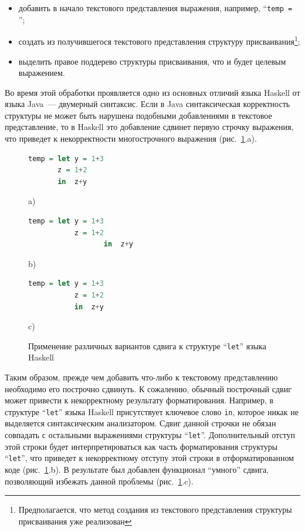 \begin{itemize}
\item добавить в начало текстового представления выражения, например, ``\lstinline{temp = }'';
\item создать из получившегося текстового представления структуру присваивания\footnote{Предполагается, что метод создания из текстового представления структуры присваивания уже реализован};
\item выделить правое поддерево структуры присваивания, что и будет целевым выражением.
\end{itemize}

Во время этой обработки проявляется одно из основных отличий языка Haskell от языка Java~--- двумерный синтаксис. Если в Java синтаксическая корректность структуры не может быть нарушена подобными добавлениями в текстовое представление, то в Haskell это добавление сдвинет первую строчку выражения, что приведет к некорректности многострочного выражения (рис.~\ref{haskellFormatSamples}.a).

\begin{figure}[ht]
\noindent\begin{minipage}{.25\textwidth}
    \begin{lstlisting}[language=Haskell,basicstyle=\scriptsize]
temp = let y = 1+3
       z = 1+2
       in  z+y
    \end{lstlisting}
\caption*{a)}    
\end{minipage}\hfill
\begin{minipage}{.40\textwidth}
    \begin{lstlisting}[language=Haskell,basicstyle=\scriptsize]
temp = let y = 1+3
           z = 1+2
                  in  z+y 
    \end{lstlisting}
\caption*{b)}    
\end{minipage}\hfill
\begin{minipage}{.25\textwidth}
    \begin{lstlisting}[language=Haskell,basicstyle=\scriptsize]
temp = let y = 1+3
           z = 1+2
           in  z+y
    \end{lstlisting}
\caption*{c)}    
\end{minipage}
\caption{Применение различных вариантов сдвига к структуре ``\lstinline{let}'' языка Haskell}    
\label{haskellFormatSamples}
\end{figure}

Таким образом, прежде чем добавить что-либо к текстовому представлению необходимо его построчно сдвинуть. К сожалению, обычный построчный сдвиг может привести к некорректному результату форматирования. Например, в структуре ``\lstinline{let}'' языка Haskell присутствует ключевое слово \lstinline{in}, которое никак не выделяется синтаксическим анализатором. Сдвиг данной строчки не обязан совпадать с остальными выражениями структуры ``\lstinline{let}''. Дополнительный отступ этой строки будет интерпретироваться как часть форматирования структуры ``\lstinline{let}'', что приведет к некорректному отступу этой строки в отформатированном коде (рис.~\ref{haskellFormatSamples}.b). В результате был добавлен функционал ``умного'' сдвига, позволяющий избежать данной проблемы (рис.~\ref{haskellFormatSamples}.c). 

